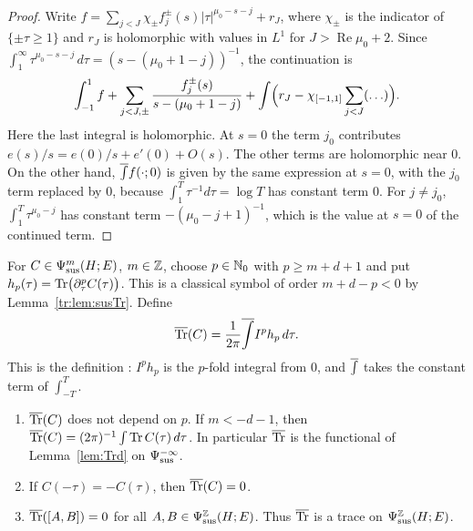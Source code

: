 \begin{proof}
Write \(f=\sum_{j<J}\chi_\pm f^\pm_j(s)|\tau|^{\mu_0-s-j}+r_J\), where
\(\chi_\pm\) is the indicator of \(\{\pm\tau\ge1\}\) and \(r_J\) is
holomorphic with values in \(L^1\) for \(J>\operatorname{Re}\mu_0+2\). Since
\(\int_1^\infty\tau^{\mu_0-s-j}\,d\tau=(s-(\mu_0+1-j))^{-1}\), the
continuation is
\[
 \int_{-1}^1f+\sum_{j<J,\pm}\frac{f^\pm_j(s)}{s-(\mu_0+1-j)}+
 \int\Bigl(r_J-\chi_{[-1,1]}\sum_{j<J}(\ldots)\Bigr).
\]
Here the last integral is holomorphic. At \(s=0\) the term \(j_0\)
contributes \(e(s)/s=e(0)/s+e'(0)+O(s)\). The other terms are holomorphic
near \(0\). On the other hand, \(\overline{\int} f(\cdot;0)\) is given by the same
expression at \(s=0\), with the \(j_0\) term replaced by \(0\), because
\(\int_1^T\tau^{-1}d\tau=\log T\) has constant term \(0\). For \(j\ne j_0\),
\(\int_1^T\tau^{\mu_0-j}\) has constant term \(-(\mu_0-j+1)^{-1}\), which is
the value at \(s=0\) of the continued term.
\end{proof}

\begin{definition}\label{tr:def:bTr}
For \(C\in\Psi_{\mathrm{sus}}^m(H;E)\), \(m\in\mathbb Z\), choose \(p\in\mathbb N_0\) with \(p\ge
m+d+1\) and put \(h_p(\tau)=\operatorname{Tr}\bigl(\partial_\tau^pC(\tau)\bigr)\). This
is a classical symbol of order \(m+d-p<0\) by Lemma~\ref{tr:lem:susTr}.
Define
\[
 \overline{\operatorname{Tr}}(C)=\frac1{2\pi}\overline{\int} I^ph_p\,d\tau .
\]
This is the definition \cite[(58)--(59)]{MN}: \(I^ph_p\) is the \(p\)-fold
integral from \(0\), and \(\overline{\int}\) takes the constant term of
\(\int_{-T}^T\).
\end{definition}

\begin{theorem}\label{tr:thm:bTr}
\begin{enumerate}
\item \(\overline{\operatorname{Tr}}(C)\) does not depend on \(p\). If \(m<-d-1\), then
\(\overline{\operatorname{Tr}}(C)=(2\pi)^{-1}\int\operatorname{Tr} C(\tau)\,d\tau\). In particular \(\overline{\operatorname{Tr}}\) is the
functional of Lemma~\ref{lem:Trd} on \(\Psi_{\mathrm{sus}}^{-\infty}\).
\item If \(C(-\tau)=-C(\tau)\), then \(\overline{\operatorname{Tr}}(C)=0\).
\item \(\overline{\operatorname{Tr}}([A,B])=0\) for all \(A,B\in\Psi_{\mathrm{sus}}^{\mathbb Z}(H;E)\). Thus \(\overline{\operatorname{Tr}}\) is
a trace on \(\Psi_{\mathrm{sus}}^{\mathbb Z}(H;E)\).
\end{enumerate}
\end{theorem}

